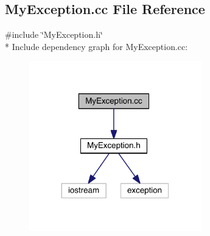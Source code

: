 \hypertarget{a00110}{}\subsection{My\+Exception.\+cc File Reference}
\label{a00110}
{\ttfamily \#include \char`\"{}My\+Exception.\+h\char`\"{}}\\*
Include dependency graph for My\+Exception.\+cc\+:\nopagebreak
\begin{figure}[H]
\begin{center}
\leavevmode
\includegraphics[width=212pt]{a00145}
\end{center}
\end{figure}
